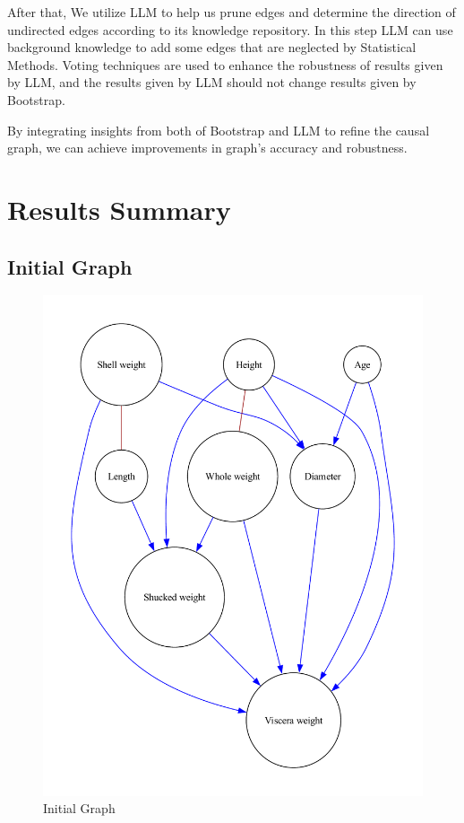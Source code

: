 \documentclass{article}
\begin{document}
After that, We utilize LLM to help us prune edges and determine the direction of undirected edges according to its knowledge repository.
In this step LLM can use background knowledge to add some edges that are neglected by Statistical Methods.
Voting techniques are used to enhance the robustness of results given by LLM, and the results given by LLM should not change results given by Bootstrap.

By integrating insights from both of Bootstrap and LLM to refine the causal graph, we can achieve improvements in graph's accuracy and robustness.
            

\section{Results Summary}

\subsection{Initial Graph}

\begin{figure}[H]
    \centering
    \includegraphics[height=0.3\textheight]{./demo_data/20241104_132155/Abalone/output_graph/initial_graph.pdf}
    \caption{Initial Graph}
\end{figure}
\end{document}
